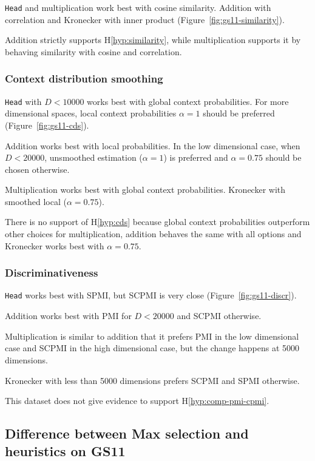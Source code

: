

\texttt{Head} and multiplication work best with cosine similarity. Addition with correlation and Kronecker with inner product (Figure~\ref{fig:gs11-similarity}).

Addition strictly supports H\ref{hyp:similarity}, while multiplication supports it by behaving similarity with cosine and correlation.

\subsubsection{Context distribution smoothing}

\texttt{Head} with $D < 10000$ works best with global context probabilities. For more dimensional spaces, local context probabilities $\alpha = 1$ should be preferred (Figure~\ref{fig:gs11-cds}).

Addition works best with local probabilities. In the low dimensional case, when $D < 20000$, unsmoothed estimation ($\alpha = 1$) is preferred and $\alpha = 0.75$ should be chosen otherwise.

Multiplication works best with global context probabilities. Kronecker with smoothed local ($\alpha = 0.75$).

There is no support of H\ref{hyp:cds} because global context probabilities outperform other choices for multiplication, addition behaves the same with all options and Kronecker works best with $\alpha = 0.75$.

\subsubsection{Discriminativeness}



\texttt{Head} works best with SPMI, but SCPMI is very close (Figure~\ref{fig:gs11-discr}).

Addition works best with PMI for $D < 20000$ and SCPMI otherwise.

Multiplication is similar to addition that it prefers PMI in the low dimensional case and SCPMI in the high dimensional case, but the change happens at 5000 dimensions.

Kronecker with less than 5000 dimensions prefers SCPMI and SPMI otherwise.

This dataset does not give evidence to support H\ref{hyp:comp-pmi-cpmi}.

\subsection{Difference between Max selection and heuristics on GS11}

